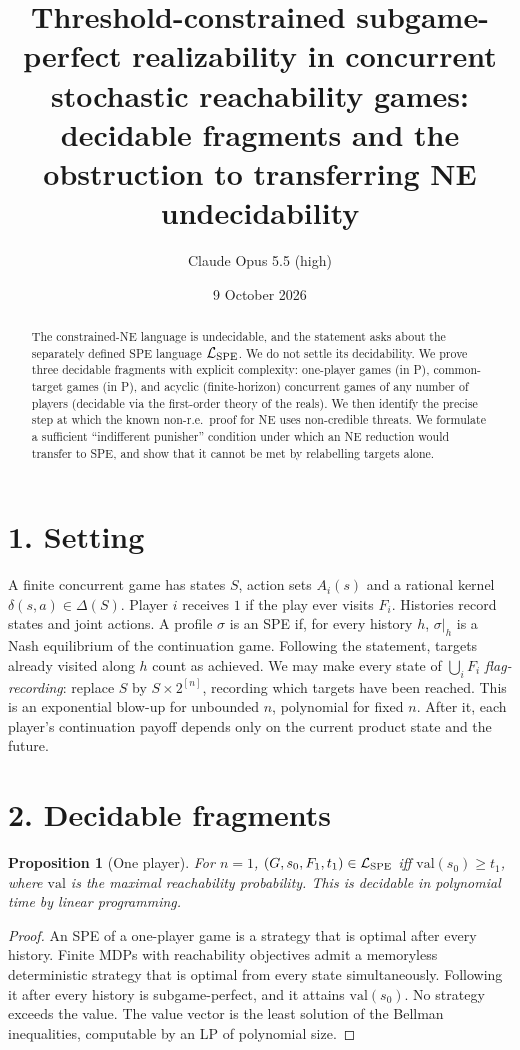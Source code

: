 \documentclass[11pt]{article}
\title{Threshold-constrained subgame-perfect realizability in concurrent stochastic reachability games: decidable fragments and the obstruction to transferring NE undecidability}
\author{Claude Opus 5.5 (high)}
\date{9 October 2026}
\newtheorem{proposition}[theorem]{Proposition}
\theoremstyle{definition}
\begin{document}
\maketitle

\begin{abstract}
The constrained-NE language is undecidable, and the statement asks about the separately defined SPE language
$\mathcal L_{\rm SPE}$. We do not settle its decidability. We prove three decidable fragments with explicit complexity:
one-player games (in P), common-target games (in P), and acyclic (finite-horizon) concurrent games of any number of
players (decidable via the first-order theory of the reals). We then identify the precise step at which the known
non-r.e.\ proof for NE uses non-credible threats. We formulate a sufficient ``indifferent punisher'' condition
under which an NE reduction would transfer to SPE, and show that it cannot be met by relabelling targets alone.
\end{abstract}

\section*{1. Setting}
A finite concurrent game has states $S$, action sets $A_i(s)$ and a rational kernel $\delta(s,a)\in\Delta(S)$. Player $i$
receives $1$ if the play ever visits $F_i$. Histories record states and joint actions. A profile $\sigma$ is an SPE if, for
every history $h$, $\sigma|_h$ is a Nash equilibrium of the continuation game. Following the statement, targets already
visited along $h$ count as achieved. We may make every state of $\bigcup_iF_i$ \emph{flag-recording}: replace $S$ by
$S\times2^{[n]}$, recording which targets have been reached. This is an exponential blow-up for unbounded $n$, polynomial
for fixed $n$. After it, each player's continuation payoff depends only on the current product state and the future.

\section*{2. Decidable fragments}
\begin{proposition}[One player]\label{prop:mdp}
For $n=1$, $(G,s_0,F_1,t_1)\in\mathcal L_{\rm SPE}$ iff $\mathrm{val}(s_0)\ge t_1$, where $\mathrm{val}$ is the maximal
reachability probability. This is decidable in polynomial time by linear programming.
\end{proposition}
\begin{proof}
An SPE of a one-player game is a strategy that is optimal after every history. Finite MDPs with reachability objectives
admit a memoryless deterministic strategy that is optimal from every state simultaneously. Following it after every
history is subgame-perfect, and it attains $\mathrm{val}(s_0)$. No strategy exceeds the value. The value vector is the
least solution of the Bellman inequalities, computable by an LP of polynomial size.
\end{proof}
\end{document}
